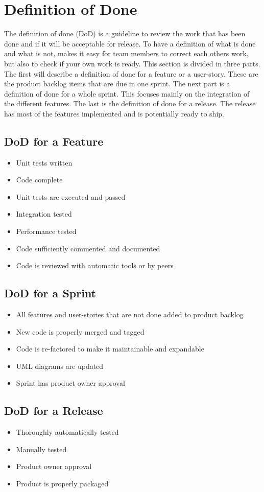 \chapter{Definition of Done}

The definition of done (DoD) is a guideline to review the work that has been done and if it will be acceptable for release. To have a definition of what is done and what is not, makes it easy for team members to correct each others work, but also to check if your own work is ready.
This section is divided in three parts. The first will describe a definition of done for a feature or a user-story. These are the product backlog items that are due in one sprint. The next part is a definition of done for a whole sprint. This focuses mainly on the integration of the different features. The last is the definition of done for a release. The release has most of the features implemented and is potentially ready to ship.

\section{DoD for a Feature}

\begin{itemize}
\item Unit tests written
\item Code complete
\item Unit tests are executed and passed
\item Integration tested
\item Performance tested
\item Code sufficiently commented and documented
\item Code is reviewed with automatic tools or by peers
\end{itemize}

\section{DoD for a Sprint}
\begin{itemize}
\item All features and user-stories that are not done added to product backlog
\item New code is properly merged and tagged
\item Code is re-factored to make it maintainable and expandable
\item \gls{UML} diagrams are updated
\item Sprint has product owner approval
\end{itemize}

\section{DoD for a Release}
\begin{itemize}
\item Thoroughly automatically tested
\item Manually tested
\item Product owner approval
\item Product is properly packaged
\end{itemize}